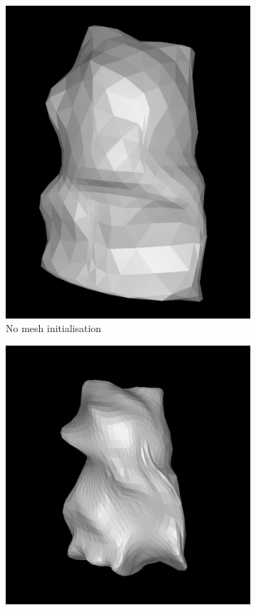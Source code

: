 \documentclass{article}
\begin{document}
\begin{figure}[h!]
\begin{subfigure}{.3\textwidth}
    \includegraphics[width=\textwidth]{images/teddyfailure.png}
    \caption{No mesh initialisation}
    \label{results-teddy-mesh1}
  \end{subfigure}
  \hfill
  \begin{subfigure}{.3\textwidth}
    \centering
    \includegraphics[width=\textwidth]{images/teddybetter.png}

\end{subfigure}
\end{figure}
\end{document}
